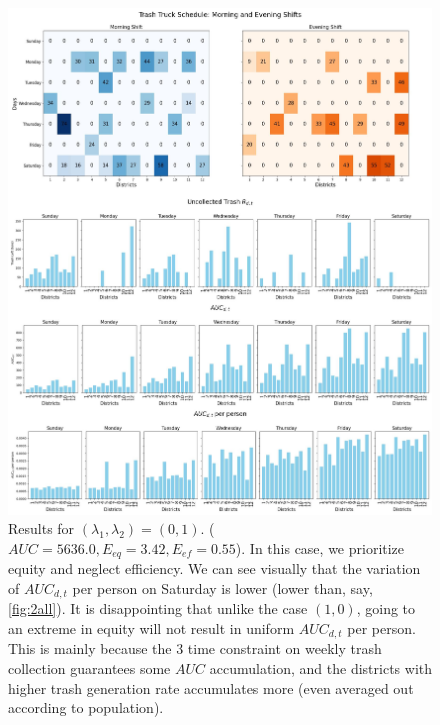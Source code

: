 \documentclass{article}
\begin{document}
\begin{figure}[H]
	\centering
	\includegraphics[width=1\textwidth]{figures/(0,1).jpg}
	\caption{Results for $(\lambda_1, \lambda_2) = (0,1)$. ($AUC = 5636.0, E_{eq} = 3.42, E_{ef} = 0.55$). In this case, we prioritize equity and neglect efficiency. We can see visually that the variation of $AUC_{d,t}$ per person on Saturday is lower (lower than, say, \cref{fig:2all}). It is disappointing that unlike the case $(1,0)$, going to an extreme in equity will not result in uniform $AUC_{d,t}$ per person. This is mainly because the 3 time constraint on weekly trash collection guarantees some $AUC$ accumulation, and the districts with higher trash generation rate accumulates more (even averaged out according to population). }
	\label{fig:4all}
\end{figure}
\end{document}
